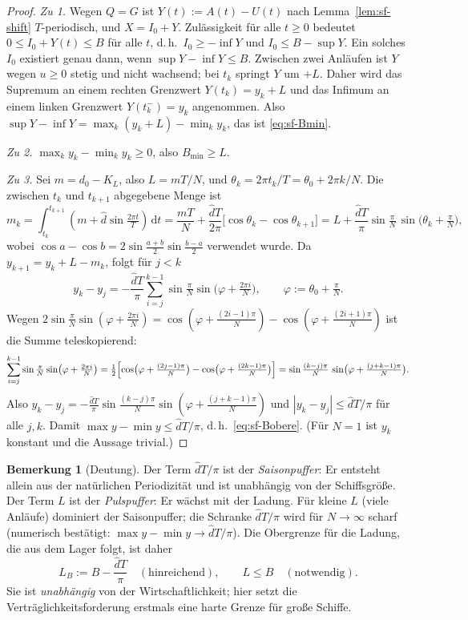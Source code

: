 \documentclass[a4paper, 12pt, twoside, openright]{report}
\providecommand{\dhat}{\hat d}      %
\theoremstyle{definition}
\theoremstyle{definition}
\newtheorem{bemerkung}{Bemerkung}[chapter]
\begin{document}
\begin{proof}
\emph{Zu 1.} Wegen $Q=G$ ist $Y(t):=A(t)-U(t)$ nach Lemma~\ref{lem:sf-shift}
$T$-periodisch, und $X=I_0+Y$. Zulässigkeit für alle $t\ge0$ bedeutet
$0\le I_0+Y(t)\le B$ für alle $t$, d.\,h.\ $I_0\ge-\inf Y$ und $I_0\le B-\sup Y$. Ein
solches $I_0$ existiert genau dann, wenn $\sup Y-\inf Y\le B$. Zwischen zwei Anläufen
ist $Y$ wegen $u\ge0$ stetig und nicht wachsend; bei $t_k$ springt $Y$ um $+L$. Daher
wird das Supremum an einem rechten Grenzwert $Y(t_k)=y_k+L$ und das Infimum an einem
linken Grenzwert $Y(t_k^-)=y_k$ angenommen. Also
$\sup Y-\inf Y=\max_k(y_k+L)-\min_k y_k$, das ist \eqref{eq:sf-Bmin}.

\emph{Zu 2.} $\max_k y_k-\min_k y_k\ge0$, also $B_{\min}\ge L$.

\emph{Zu 3.} Sei $m=d_0-K_L$, also $L=mT/N$, und $\theta_k=2\pi t_k/T=\theta_0+2\pi k/N$.
Die zwischen $t_k$ und $t_{k+1}$ abgegebene Menge ist
\[
  m_k=\int_{t_k}^{t_{k+1}}(m+\dhat\sin\tfrac{2\pi t}{T})\,\mathrm{d}t
  =\frac{mT}{N}+\frac{\dhat T}{2\pi}\bigl[\cos\theta_k-\cos\theta_{k+1}\bigr]
  =L+\frac{\dhat T}{\pi}\sin\tfrac{\pi}{N}\,\sin\bigl(\theta_k+\tfrac{\pi}{N}\bigr),
\]
wobei $\cos a-\cos b=2\sin\frac{a+b}{2}\sin\frac{b-a}{2}$ verwendet wurde. Da
$y_{k+1}=y_k+L-m_k$, folgt für $j<k$
\[
  y_k-y_j=-\frac{\dhat T}{\pi}\sum_{i=j}^{k-1}\sin\tfrac{\pi}{N}\sin\bigl(\varphi+\tfrac{2\pi i}{N}\bigr),
  \qquad\varphi:=\theta_0+\tfrac{\pi}{N}.
\]
Wegen $2\sin\frac{\pi}{N}\sin(\varphi+\frac{2\pi i}{N})
=\cos(\varphi+\frac{(2i-1)\pi}{N})-\cos(\varphi+\frac{(2i+1)\pi}{N})$ ist die Summe
teleskopierend:
\[
  \sum_{i=j}^{k-1}\sin\tfrac{\pi}{N}\sin\bigl(\varphi+\tfrac{2\pi i}{N}\bigr)
  =\tfrac12\Bigl[\cos\bigl(\varphi+\tfrac{(2j-1)\pi}{N}\bigr)-\cos\bigl(\varphi+\tfrac{(2k-1)\pi}{N}\bigr)\Bigr]
  =\sin\tfrac{(k-j)\pi}{N}\,\sin\bigl(\varphi+\tfrac{(j+k-1)\pi}{N}\bigr).
\]
Also $y_k-y_j=-\frac{\dhat T}{\pi}\sin\frac{(k-j)\pi}{N}\sin(\varphi+\frac{(j+k-1)\pi}{N})$
und $|y_k-y_j|\le\dhat T/\pi$ für alle $j,k$. Damit
$\max y-\min y\le\dhat T/\pi$, d.\,h.\ \eqref{eq:sf-Bobere}. (Für $N=1$ ist
$y_k$ konstant und die Aussage trivial.)
\end{proof}

\begin{bemerkung}[Deutung]\label{bem:sf-saison}
Der Term $\dhat T/\pi$ ist der \emph{Saisonpuffer}: Er entsteht allein aus der
natürlichen Periodizität und ist unabhängig von der Schiffsgröße. Der Term $L$ ist der
\emph{Pulspuffer}: Er wächst mit der Ladung. Für kleine $L$ (viele Anläufe)
dominiert der Saisonpuffer; die Schranke $\dhat T/\pi$ wird für $N\to\infty$ scharf
(numerisch bestätigt: $\max y-\min y\to\dhat T/\pi$). Die Obergrenze für die Ladung,
die aus dem Lager folgt, ist daher
\begin{equation}
  L_B:=B-\frac{\dhat T}{\pi}\quad(\text{hinreichend}),\qquad L\le B\quad(\text{notwendig}).
  \label{eq:sf-LB}
\end{equation}
Sie ist \emph{unabhängig} von der Wirtschaftlichkeit; hier setzt die
Verträglichkeitsforderung erstmals eine harte Grenze für große Schiffe.
\end{bemerkung}
\end{document}
